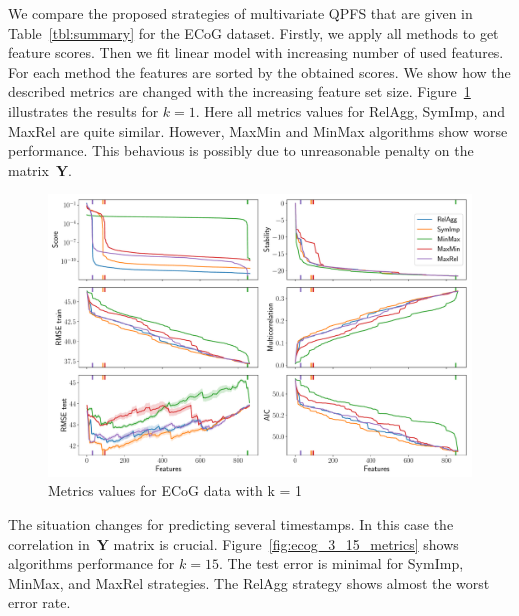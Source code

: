 \documentclass[12pt,twoside]{article}
\theoremstyle{definition}
\newcommand{\bY}{\mathbf{Y}}
\begin{document}
We compare the proposed strategies of multivariate QPFS that are given in Table~\ref{tbl:summary} for the ECoG dataset. 
Firstly, we apply all methods to get feature scores. 
Then we fit linear model with increasing number of used features. 
For each method the features are sorted by the obtained scores. 
We show how the described metrics are changed with the increasing feature set size. 
Figure~\ref{fig:ecog_3_1_metrics} illustrates the results for $k = 1$. 
Here all metrics values for RelAgg, SymImp, and MaxRel are quite similar. 
However, MaxMin and MinMax algorithms show worse performance. 
This behavious is possibly due to unreasonable penalty on the matrix~$\bY$.
\begin{figure}[h]
	\includegraphics[width=\linewidth]{figs/ecog_3_1_metrics.pdf}
	\caption{Metrics values for ECoG data with k = 1}
	\label{fig:ecog_3_1_metrics}
\end{figure}

The situation changes for predicting several timestamps. 
In this case the correlation in~$\bY$ matrix is crucial. 
Figure~\ref{fig:ecog_3_15_metrics} shows algorithms performance for $k = 15$. 
The test error is minimal for SymImp, MinMax, and MaxRel strategies.  
The RelAgg strategy shows almost the worst error rate.
\end{document}

